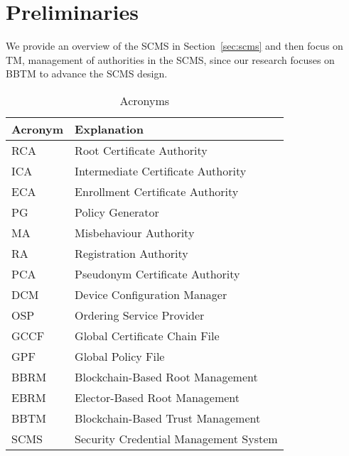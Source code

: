 \section{Preliminaries} 
\label{sec:background}

We provide an overview of the SCMS in Section~\ref{sec:scms} and then focus on TM, management of authorities in the SCMS, since our research focuses on BBTM to advance the SCMS design.

\begin{table}[t]
\small
\centering
\begin{tabular} { |p{2cm} | p{5.5cm} | }
\hline 
\textbf{Acronym} & \textbf{Explanation}  \\\hline 
RCA & Root Certificate Authority \\\hline 
ICA & Intermediate Certificate Authority \\\hline
ECA & Enrollment Certificate Authority \\\hline
PG & Policy Generator \\\hline 
MA & Misbehaviour Authority \\\hline
RA & Registration Authority \\\hline
PCA & Pseudonym Certificate Authority \\\hline 
DCM & Device Configuration Manager \\\hline
OSP & Ordering Service Provider \\\hline 
GCCF & Global Certificate Chain File \\\hline
GPF & Global Policy File \\\hline
BBRM & Blockchain-Based Root Management \\\hline  
EBRM & Elector-Based Root Management \\\hline 
BBTM & Blockchain-Based Trust Management \\\hline 
SCMS & Security Credential Management System \\\hline 
\end{tabular}
\caption{Acronyms}
\label{table:acronyms}
\end{table} 

